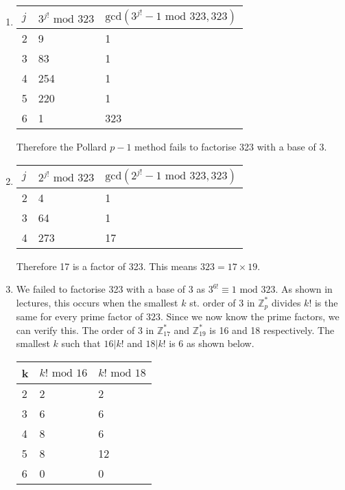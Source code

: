 \begin{enumerate}

\item
\begin{tabular}{l l l}
\hline$j$ & $3^{j!} \text{ mod } 323$ & $\text{gcd}(3^{j!} - 1  \text{ mod } 323, 323)$ \\ \hline
2 & 9 & 1 \\ \hline
3 & 83 & 1 \\ \hline
4 & 254 & 1 \\ \hline
5 & 220 & 1 \\ \hline
6 & 1 & 323 \\ \hline
\end{tabular}

Therefore the Pollard $p-1$ method fails to factorise 323 with a base of 3.

\item
\begin{tabular}{l l l}
\hline$j$ & $2^{j!} \text{ mod } 323$ & $\text{gcd}(2^{j!} - 1  \text{ mod } 323, 323)$ \\ \hline
2 & 4 & 1 \\ \hline
3 & 64 & 1 \\ \hline
4 & 273 & 17 \\ \hline
\end{tabular}

Therefore 17 is a factor of 323. This means $323 = 17 \times 19$.

\item We failed to factorise 323 with a base of 3 as $3^{6!} \equiv 1 \text{ mod } 323 $. As shown in lectures, this occurs when the smallest $k$ st. order of 3 in $\mathbb{Z}_p^*$ divides $k!$ is the same for every prime factor of $323$. Since we now know the prime factors, we can verify this. The order of $3$ in $\mathbb{Z}_{17}^*$ and $\mathbb{Z}_{19}^*$ is 16 and 18 respectively. The smallest $k$ such that $16 | k!$ and $18 | k!$ is 6 as shown below.

\begin{tabular}{l l l}
\hline k & $k! \text{ mod } 16$ & $k! \text{ mod } 18$ \\ \hline
2 & 2 & 2 \\ \hline
3 & 6 & 6 \\ \hline
4 & 8 & 6 \\ \hline
5 & 8 & 12 \\ \hline
6 & 0 & 0 \\ \hline
\end{tabular}


\end{enumerate}
